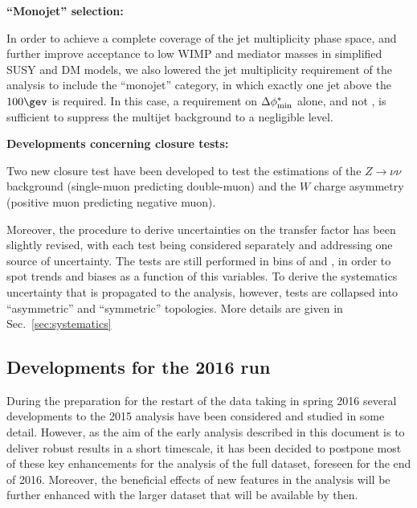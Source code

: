 {\bf ``Monojet'' selection:}

In order to achieve a complete coverage of the jet multiplicity phase space,
and further improve acceptance to low WIMP and mediator masses
in simplified SUSY and DM models, we also lowered the jet multiplicity 
requirement of the analysis to include the ``monojet'' category, in which
exactly one jet above the $100\gev$ is required. In this case, a requirement on
$\mbox{$\Delta\phi^{*}_{\rm min}$}$ alone, and not \alphat, is sufficient to suppress the multijet
background to a negligible level.


{\bf Developments concerning closure tests:}

Two new closure test have been developed to test the estimations of the $Z \to \nu \nu$
background (single-muon predicting double-muon) and the $W$ charge asymmetry (positive muon predicting negative muon). 

Moreover, the procedure to derive uncertainties on the transfer factor has been slightly revised, 
with each test being considered separately and addressing one source of uncertainty. 
The tests are still performed in bins of \nj and \scalht, 
in order to spot trends and biases as a function of this variables. 
To derive the systematics uncertainty that is propagated to the analysis, however, 
tests are collapsed into ``asymmetric'' and ``symmetric'' topologies. 
More details are given in Sec.~\ref{sec:systematics}


\subsection{Developments for the 2016 run \label{sec:devs_2016}}
During the preparation for the restart of the data taking in spring 2016 
several developments to the 2015 analysis have been considered and studied in some detail. 
However, as the aim of the early analysis described in this document is to deliver 
robust results in a short timescale, it has been decided to postpone most of these key enhancements 
for the analysis of the full dataset, foreseen for the end of 2016. 
Moreover, the beneficial effects of new features in the analysis will be further enhanced 
with the larger dataset that will be available by then. 

